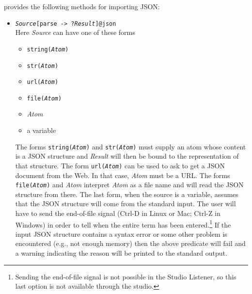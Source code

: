\ERGO provides the following methods for importing JSON:
\begin{itemize}
\item
  \texttt{\emph{Source}[parse -> ?\emph{Result}]@\bs{}json}\\
  Here \emph{Source} can have one of these forms
  \begin{itemize}
  \item   \texttt{string(\emph{Atom})}  
  \item   \texttt{str(\emph{Atom})}
  \item   \texttt{url(\emph{Atom})}
  \item   \texttt{file(\emph{Atom})}
  \item   \emph{Atom}
  \item   a variable
  \end{itemize}
  The forms \texttt{string(\emph{Atom})} and \texttt{str(\emph{Atom})}
  must supply an atom whose content is a JSON structure and
  \emph{Result} will then be bound to the \ERGO representation of that
  structure.
  The form \texttt{url(\emph{Atom})} can be used to ask \ERGO to get a JSON
  document from the Web. In that case, \emph{Atom} must be a URL. 
  The forms \texttt{file(\emph{Atom})} and \emph{Atom}
  interpret \emph{Atom} as a file name and will read the JSON structure
  from there. The last form, when the source is a variable, assumes
  that the JSON structure will come from the standard input. The user will
  have to send the end-of-file signal (Ctrl-D in Linux or Mac; Ctrl-Z in
  Windows) in order to tell when the entire term has been entered.\footnote{
    Sending the end-of-file signal is not possible in the \ERGOAI Studio Listener,
    so this last option is not available through the studio.
  }
  If the input JSON structure contains a syntax error or some other problem
  is encountered (e.g., not enough memory) then the above predicate will
  fail and a warning indicating the reason will be printed to the standard
  output.


\end{itemize}
